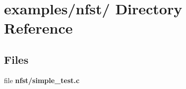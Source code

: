 \hypertarget{dir_000032}{
\section{examples/nfst/ Directory Reference}
\label{dir_000032}
}
\subsection*{Files}
\begin{CompactItemize}
\item 
file {\bf nfst/simple\_\-test.c}
\end{CompactItemize}
